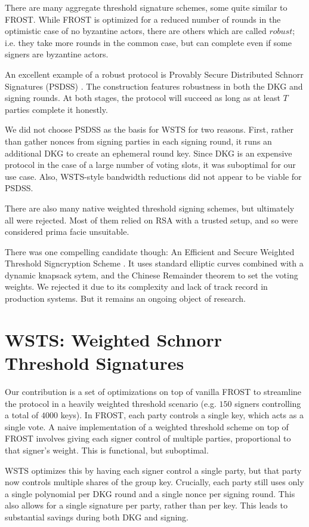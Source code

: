 \documentclass{article}
\begin{document}
There are many aggregate threshold signature schemes, some quite similar to FROST.  While FROST is optimized for a reduced number of rounds in the optimistic case of no byzantine actors, there are others which are called $robust$; i.e. they take more rounds in the common case, but can complete even if some signers are byzantine actors.

An excellent example of a robust protocol is Provably Secure Distributed Schnorr Signatures (PSDSS) \cite{psdss}.  The construction features robustness in both the DKG and signing rounds.  At both stages, the protocol will succeed as long as at least $T$ parties complete it honestly.

We did not choose PSDSS as the basis for WSTS for two reasons.  First, rather than gather nonces from signing parties in each signing round, it runs an additional DKG to create an ephemeral round key.  Since DKG is an expensive protocol in the case of a large number of voting slots, it was suboptimal for our use case.  Also, WSTS-style bandwidth reductions did not appear to be viable for PSDSS.

There are also many native weighted threshold signing schemes, but ultimately all were rejected.  Most of them relied on RSA with a trusted setup, and so were considered prima facie unsuitable.

There was one compelling candidate though: An Efficient and Secure Weighted Threshold Signcryption Scheme \cite{eswtss}.  It uses standard elliptic curves combined with a dynamic knapsack sytem, and the Chinese Remainder theorem to set the voting weights.  We rejected it due to its complexity and lack of track record in production systems.  But it remains an ongoing object of research.

\section{
  WSTS: Weighted Schnorr Threshold Signatures
}

Our contribution is a set of optimizations on top of vanilla FROST to streamline the protocol in a heavily weighted threshold scenario (e.g. $150$ signers controlling a total of $4000$ keys). In FROST, each party controls a single key, which acts as a single vote.  A naive implementation of a weighted threshold scheme on top of FROST involves giving each signer control of multiple parties, proportional to that signer's weight.  This is functional, but suboptimal.

WSTS optimizes this by having each signer control a single party, but that party now controls multiple shares of the group key.  Crucially, each party still uses only a single polynomial per DKG round and a single nonce per signing round.  This also allows for a single signature per party, rather than per key.  This leads to substantial savings during both DKG and signing.
\end{document}
